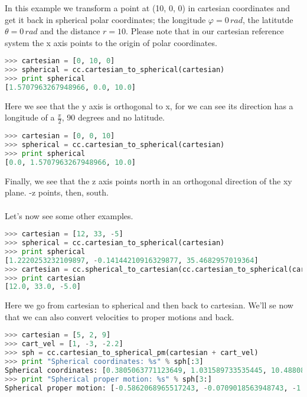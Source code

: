 \documentclass[
a4paper, %
11pt, %
onecolumn, %
openany, %
]{memoir}
\begin{document}
In this example we transform a point at (10, 0, 0) in cartesian coordinates and get it back in spherical polar coordinates;
the longitude $\varphi=0\, rad$, the latitutde $\theta=0\, rad$ and the distance $r=10$. Please note that in our cartesian reference system the x axis points
to the origin of polar coordinates.

\begin{lstlisting}[language=Python]
>>> cartesian = [0, 10, 0]
>>> spherical = cc.cartesian_to_spherical(cartesian)
>>> print spherical
[1.5707963267948966, 0.0, 10.0]
\end{lstlisting}

Here we see that the y axis is orthogonal to x, for we can see its direction has a longitude of a $\frac{\pi}{2}$, 90 degrees and no latitude.

\begin{lstlisting}[language=Python]
>>> cartesian = [0, 0, 10]
>>> spherical = cc.cartesian_to_spherical(cartesian)
>>> print spherical
[0.0, 1.5707963267948966, 10.0]
\end{lstlisting}

Finally, we see that the z axis points north in an orthogonal direction of the xy plane. -z points, then, south. \\\\
Let's now see some other examples.

\begin{lstlisting}[language=Python]
>>> cartesian = [12, 33, -5]
>>> spherical = cc.cartesian_to_spherical(cartesian)
>>> print spherical
[1.2220253232109897, -0.14144210916329877, 35.4682957019364]
>>> cartesian = cc.spherical_to_cartesian(cc.cartesian_to_spherical(cartesian))
>>> print cartesian
[12.0, 33.0, -5.0]
\end{lstlisting}

Here we go from cartesian to spherical and then back to cartesian. We'll se now that we can also
convert velocities to proper motions and back.

\begin{lstlisting}[language=Python]
>>> cartesian = [5, 2, 9]
>>> cart_vel = [1, -3, -2.2]
>>> sph = cc.cartesian_to_spherical_pm(cartesian + cart_vel)
>>> print "Spherical coordinates: %s" % sph[:3]
Spherical coordinates: [0.3805063771123649, 1.031589733535445, 10.488088481701515]
>>> print "Spherical proper motion: %s" % sph[3:]
Spherical proper motion: [-0.5862068965517243, -0.0709018563948743, -1.9832021856308324]
\end{lstlisting}
\end{document}
